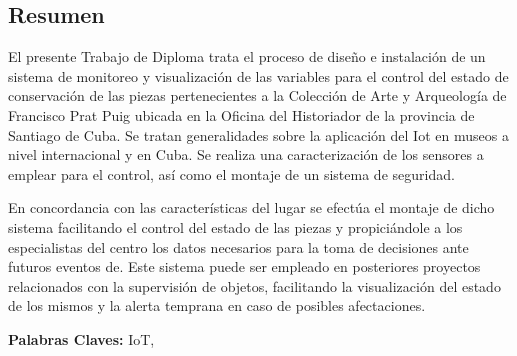 \begin{center}
    \section*{Resumen}\label{sec: resumen}
\end{center}

El presente Trabajo de Diploma trata el proceso de diseño e instalación de un sistema de monitoreo y visualización de las variables para el control del estado de conservación de las piezas pertenecientes a la Colección de Arte y Arqueología de Francisco Prat Puig ubicada en la Oficina del Historiador de la provincia de Santiago de Cuba. Se tratan generalidades sobre la aplicación del Iot en museos a nivel internacional y en Cuba. Se realiza una caracterización de los sensores a emplear para el control, así como el montaje de un sistema de seguridad.

En concordancia con las características del lugar se efectúa el montaje de dicho sistema facilitando el control del estado de las piezas y propiciándole a los especialistas del centro los datos necesarios para la toma de decisiones ante futuros eventos de. Este sistema puede ser empleado en posteriores proyectos relacionados con la supervisión de objetos, facilitando la visualización del estado de los mismos y la alerta temprana en caso de posibles afectaciones.

\vfill

\begin{flushleft}
    \textbf{Palabras Claves: }IoT, 
\end{flushleft}